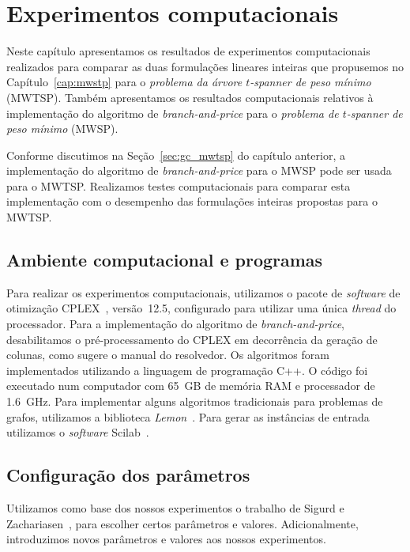 
\chapter{Experimentos computacionais}
\label{cap:experimentos}
Neste capítulo apresentamos os resultados de experimentos computacionais
 realizados para comparar as duas formulações lineares
inteiras que propusemos no Capítulo~\ref{cap:mwstp} para o \textit{problema
  da árvore $t$-spanner de peso mínimo} (MWTSP). Também apresentamos
os resultados computacionais relativos à implementação do
algoritmo de \emph{branch-and-price} para o \textit{problema de
  $t$-spanner de peso mínimo} (MWSP).

Conforme discutimos na Seção~\ref{sec:gc_mwtsp} do capítulo anterior,
a implementação do algoritmo de \emph{branch-and-price} para o MWSP
pode ser usada para o MWTSP. Realizamos testes computacionais para
comparar esta implementação com o desempenho das formulações inteiras
propostas para o MWTSP.

\section{Ambiente computacional e programas}
Para realizar os experimentos computacionais, utilizamos o pacote de
\emph{software} de otimização CPLEX~\cite{Cplex2018}, versão~12.5,
configurado para utilizar uma única \emph{thread} do
processador. Para a implementação do algoritmo de \emph{branch-and-price},
desabilitamos o pré-processamento do CPLEX em decorrência
da geração de colunas, como sugere o manual do resolvedor.  Os
algoritmos foram implementados utilizando a linguagem de programação
C++. O código foi executado num computador com 65~GB de memória RAM e
processador de 1.6~GHz.  Para implementar alguns algoritmos
tradicionais para problemas de grafos, utilizamos a biblioteca
\emph{Lemon}~\cite{Lemon2016}.  Para gerar as instâncias de entrada
utilizamos o \emph{software} Scilab~\cite{Scilab2018}.

\section{Configuração dos parâmetros}
\label{sec:parametros}
Utilizamos como base dos nossos experimentos o trabalho de Sigurd e
Zachariasen~\cite{SigurdZ2004}, para escolher certos parâmetros e
valores. Adicionalmente, introduzimos novos parâmetros e valores aos
nossos experimentos. 

